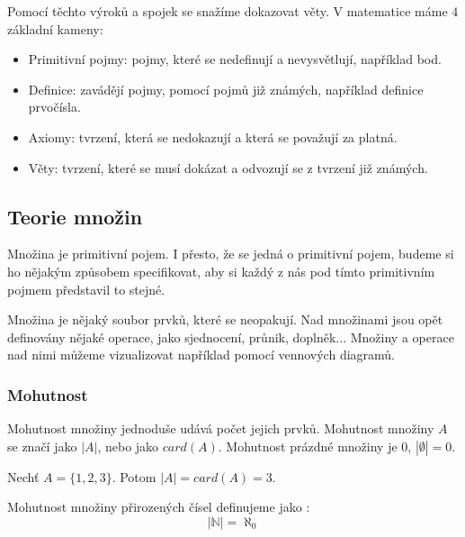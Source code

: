 Pomocí těchto výroků a spojek se snažíme dokazovat věty. V matematice máme 4 základní kameny:
\begin{itemize}
	\item Primitivní pojmy: pojmy, které se nedefinují a nevysvětlují, například bod.
	\item Definice: zavádějí pojmy, pomocí pojmů již známých, například definice prvočísla.
	\item Axiomy: tvrzení, která se nedokazují a která se považují za platná.
	\item Věty: tvrzení, které se musí dokázat a odvozují se z tvrzení již známých.
\end{itemize}

\subsection{Teorie množin}

Množina je primitivní pojem. I přesto, že se jedná o primitivní pojem, budeme si ho nějakým
způsobem specifikovat, aby si každý z nás pod tímto primitivním pojmem představil to stejné.

\begin{concept}[Množina]
Množina je nějaký soubor prvků, které se neopakují.
Nad množinami jsou opět definovány nějaké operace, jako sjednocení, průnik, doplněk...
Množiny a operace nad nimi můžeme vizualizovat například pomocí vennových diagramů.
\end{concept}

\subsubsection*{Mohutnost}
\begin{concept}
    Mohutnost množiny jednoduše udává počet jejich prvků. Mohutnost množiny $A$ se značí
    jako $|A|$, nebo jako $card(A)$.
    Mohutnost prázdné množiny je 0, $|\emptyset| = 0$.
\end{concept}
\begin{example}
    Nechť $A = \{1, 2, 3\}$. Potom $|A| = card(A) = 3$.
\end{example}

\begin{definition}
	Mohutnost množiny přirozených čísel definujeme jako :
    $$|\mathbb{N}|=\aleph_0$$
\end{definition}

